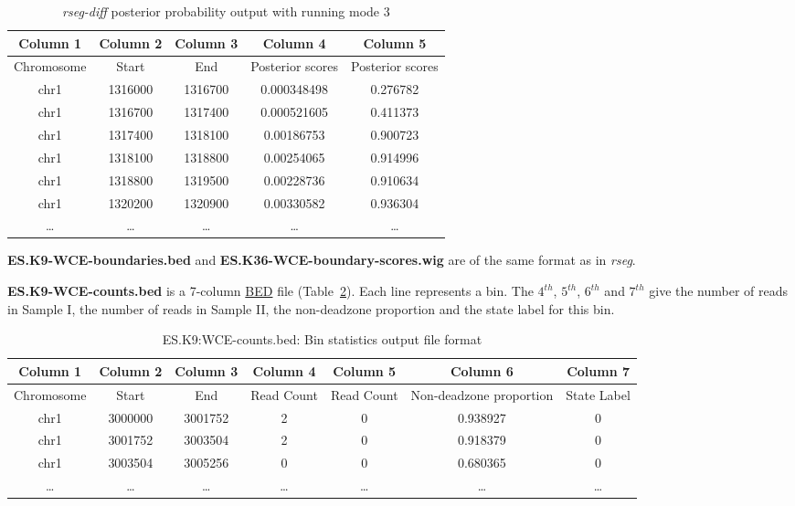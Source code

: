 \documentclass[11pt]{report}
\begin{document}
\begin{table}[th]
  \centering
  \begin{tabular}{c c c c c }
Column 1 & Column 2 & Column 3 &  Column 4 & Column 5  \\
\hline
Chromosome  & Start & End &  Posterior scores & Posterior scores \\
\hline
chr1 &   1316000& 1316700& 0.000348498&     0.276782 \\
chr1 &   1316700& 1317400& 0.000521605&     0.411373 \\
chr1 &   1317400& 1318100& 0.00186753 &     0.900723 \\
chr1 &   1318100& 1318800& 0.00254065 &     0.914996 \\
chr1 &   1318800& 1319500& 0.00228736 &     0.910634 \\
chr1 &   1320200& 1320900& 0.00330582 &     0.936304 \\
\ldots & \ldots &\ldots &\ldots &\ldots \\ 
\hline
  \end{tabular}
  \caption{\textit{rseg-diff} posterior probability  output with running mode 3}
  \label{tab:format-score-diff}
\end{table}

\textbf{ES.K9-WCE-boundaries.bed} and
\textbf{ES.K36-WCE-boundary-scores.wig} are of the same format as
in \textit{rseg}.

\textbf{ES.K9-WCE-counts.bed} is a 7-column
\href{http://genome.ucsc.edu/FAQ/FAQformat.html#format1}{BED} file
(Table~\ref{tab:format-bin-diff}). Each line represents a bin. The $4^{th}$,
$5^{th}$, $6^{th}$ and $7^{th}$ give the number of reads in Sample I, the number
of reads in Sample II, the non-deadzone proportion and the state label for this
bin.

\begin{table}[th]
  \centering
  \begin{tabular}{c c c c c c c }
    Column 1 & Column 2 & Column 3 &  Column 4 & Column 5 &  Column 6
    & Column 7\\
    \hline
    Chromosome  & Start & End & Read Count & Read Count & Non-deadzone proportion &
    State Label \\
    \hline
chr1&    3000000& 3001752& 2&       0&       0.938927&        0\\
chr1&    3001752& 3003504& 2&       0&       0.918379&        0\\
chr1&    3003504& 3005256& 0&       0&       0.680365&        0\\
    \ldots & \ldots &\ldots &\ldots &\ldots &\ldots & \ldots \\ 
    \hline
  \end{tabular}
  \caption{ES.K9:WCE-counts.bed: Bin statistics output file format}
  \label{tab:format-bin-diff}
\end{table}
\end{document}
